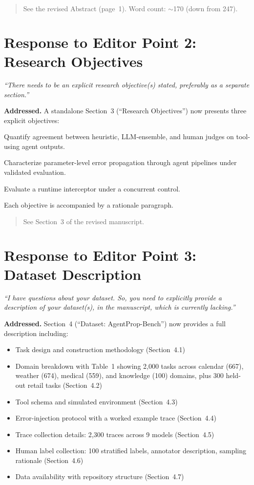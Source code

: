 \documentclass[11pt]{article}
\newcommand{\editortext}[1]{\textit{\color{gray}#1}}
\newcommand{\newtext}[1]{\begin{quote}\small #1\end{quote}}
\begin{document}
\newtext{See the revised Abstract (page~1). Word count: ${\sim}$170 (down from 247).}

\section{Response to Editor Point 2: Research Objectives}

\editortext{``There needs to be an explicit research objective(s) stated,
preferably as a separate section.''}

\textbf{Addressed.} A standalone Section~3 (``Research Objectives'') now
presents three explicit objectives:
\begin{description}[nosep]
  \item[RO1] Quantify agreement between heuristic, LLM-ensemble, and human
    judges on tool-using agent outputs.
  \item[RO2] Characterize parameter-level error propagation through agent
    pipelines under validated evaluation.
  \item[RO3] Evaluate a runtime interceptor under a concurrent control.
\end{description}
Each objective is accompanied by a rationale paragraph.

\newtext{See Section~3 of the revised manuscript.}

\section{Response to Editor Point 3: Dataset Description}

\editortext{``I have questions about your dataset. So, you need to
explicitly provide a description of your dataset(s), in the manuscript,
which is currently lacking.''}

\textbf{Addressed.} Section~4 (``Dataset: AgentProp-Bench'') now provides
a full description including:
\begin{itemize}[nosep]
  \item Task design and construction methodology (Section~4.1)
  \item Domain breakdown with Table~1 showing 2,000 tasks across
        calendar (667), weather (674), medical (559), and knowledge (100)
        domains, plus 300 held-out retail tasks (Section~4.2)
  \item Tool schema and simulated environment (Section~4.3)
  \item Error-injection protocol with a worked example trace (Section~4.4)
  \item Trace collection details: 2,300 traces across 9 models (Section~4.5)
  \item Human label collection: 100 stratified labels, annotator description,
        sampling rationale (Section~4.6)
  \item Data availability with repository structure (Section~4.7)
\end{itemize}
\end{document}

